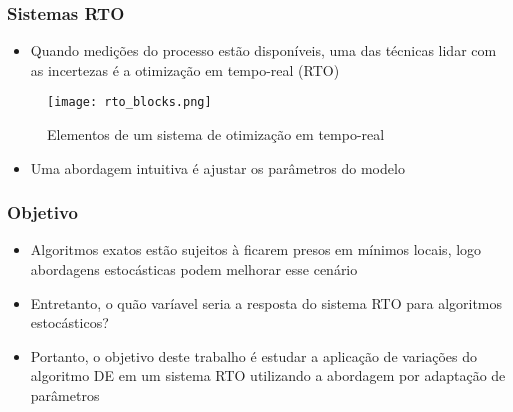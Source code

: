 \documentclass{beamer}
\begin{document}
\begin{frame}
	\frametitle{Sistemas RTO}
	\begin{itemize}
		\item Quando medições do processo estão disponíveis, uma das técnicas lidar com as incertezas é a otimização em tempo-real (RTO)
	\end{itemize}
	\begin{figure}
		\centering
		\texttt{[image: rto\_blocks.png]}
		\caption{Elementos de um sistema de otimização em tempo-real}
		\label{fig:rtoOverview}
	\end{figure}
	\begin{itemize}
		\item Uma abordagem intuitiva é ajustar os parâmetros do modelo
	\end{itemize}
	
\end{frame}

\begin{frame}
	\frametitle{Objetivo}
	\begin{itemize}
		\item Algoritmos exatos estão sujeitos à ficarem presos em mínimos locais, logo abordagens estocásticas podem melhorar esse cenário
		\item Entretanto, o quão varíavel seria a resposta do sistema RTO para algoritmos estocásticos?
		\item Portanto, o objetivo deste trabalho é estudar a aplicação de variações do algoritmo DE em um sistema RTO utilizando a abordagem por adaptação de parâmetros
	\end{itemize}
\end{frame}


%	
%
%
\end{document}
